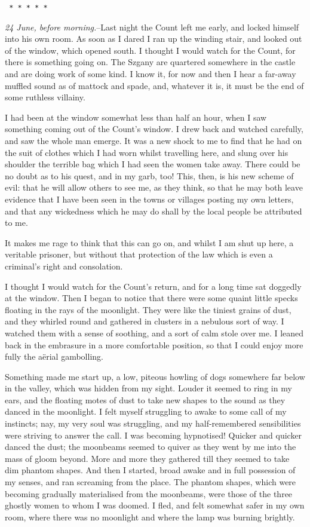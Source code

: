 \documentclass[12pt,openright]{book}
\begin{document}
\texttt{   *       *       *       *       *}

\textit{24 June, before morning.}–Last night the Count left me early, and locked himself into his own room. As soon as I dared I ran up the winding stair, and looked out of the window, which opened south. I thought I would watch for the Count, for there is something going on. The Szgany are quartered somewhere in the castle and are doing work of some kind. I know it, for now and then I hear a far-away muffled sound as of mattock and spade, and, whatever it is, it must be the end of some ruthless villainy.

I had been at the window somewhat less than half an hour, when I saw something coming out of the Count’s window. I drew back and watched carefully, and saw the whole man emerge. It was a new shock to me to find that he had on the suit of clothes which I had worn whilst travelling here, and slung over his shoulder the terrible bag which I had seen the women take away. There could be no doubt as to his quest, and in my garb, too! This, then, is his new scheme of evil: that he will allow others to see me, as they think, so that he may both leave evidence that I have been seen in the towns or villages posting my own letters, and that any wickedness which he may do shall by the local people be attributed to me.

It makes me rage to think that this can go on, and whilst I am shut up here, a veritable prisoner, but without that protection of the law which is even a criminal’s right and consolation.

I thought I would watch for the Count’s return, and for a long time sat doggedly at the window. Then I began to notice that there were some quaint little specks floating in the rays of the moonlight. They were like the tiniest grains of dust, and they whirled round and gathered in clusters in a nebulous sort of way. I watched them with a sense of soothing, and a sort of calm stole over me. I leaned back in the embrasure in a more comfortable position, so that I could enjoy more fully the aërial gambolling.

Something made me start up, a low, piteous howling of dogs somewhere far below in the valley, which was hidden from my sight. Louder it seemed to ring in my ears, and the floating motes of dust to take new shapes to the sound as they danced in the moonlight. I felt myself struggling to awake to some call of my instincts; nay, my very soul was struggling, and my half-remembered sensibilities were striving to answer the call. I was becoming hypnotised! Quicker and quicker danced the dust; the moonbeams seemed to quiver as they went by me into the mass of gloom beyond. More and more they gathered till they seemed to take dim phantom shapes. And then I started, broad awake and in full possession of my senses, and ran screaming from the place. The phantom shapes, which were becoming gradually materialised from the moonbeams, were those of the three ghostly women to whom I was doomed. I fled, and felt somewhat safer in my own room, where there was no moonlight and where the lamp was burning brightly.
\end{document}
